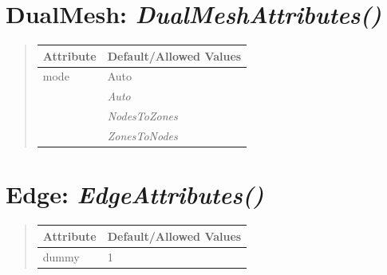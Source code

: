 \documentclass[letterpaper,10pt,english]{sphinxmanual}
\begin{document}
\begin{DUlineblock}{0em}
\item[] 
\end{DUlineblock}


\section{\textbf{DualMesh}: \emph{DualMeshAttributes()}}
\label{attributes:dualmesh-dualmeshattributes}
\begin{DUlineblock}{0em}
\item[] 
\end{DUlineblock}
\begin{quote}

\begin{tabulary}{\linewidth}{|L|L|}
\hline

\textbf{Attribute}
 & 
\textbf{Default/Allowed Values}
\\
\hline
mode
 & 
Auto
\\
\hline & 
\emph{Auto}
\\
\hline & 
\emph{NodesToZones}
\\
\hline & 
\emph{ZonesToNodes}
\\
\hline\end{tabulary}

\end{quote}

\begin{DUlineblock}{0em}
\item[] 
\end{DUlineblock}

\begin{DUlineblock}{0em}
\item[] 
\end{DUlineblock}


\section{\textbf{Edge}: \emph{EdgeAttributes()}}
\label{attributes:edge-edgeattributes}
\begin{DUlineblock}{0em}
\item[] 
\end{DUlineblock}
\begin{quote}

\begin{tabulary}{\linewidth}{|L|L|}
\hline

\textbf{Attribute}
 & 
\textbf{Default/Allowed Values}
\\
\hline
dummy
 & 
1
\\
\hline\end{tabulary}

\end{quote}
\end{document}
